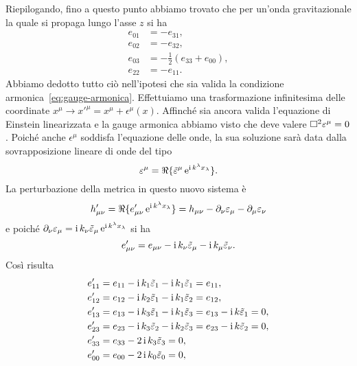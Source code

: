 Riepilogando, fino a questo punto abbiamo trovato che per un'onda gravitazionale
la quale si propaga lungo l'asse $z$ si ha
\begin{subequations}
  \begin{align}
    e_{01} &= -e_{31}, \\
    e_{02} &= -e_{32}, \\
    e_{03} &= -\frac{1}{2}(e_{33} + e_{00}), \\
    e_{22} &= -e_{11}.
  \end{align}
\end{subequations}
Abbiamo dedotto tutto ciò nell'ipotesi che sia valida la condizione
armonica~\eqref{eq:gauge-armonica}.  Effettuiamo una trasformazione infinitesima
delle coordinate $x^{\mu} \to x'^{\mu} = x^{\mu} + \epsilon^{\mu}(x)$.  Affinché
sia ancora valida l'equazione di Einstein linearizzata e la gauge armonica
abbiamo visto che deve valere $\Box^{2} \varepsilon^{\mu} = 0$.  Poiché anche
$\epsilon^{\mu}$ soddisfa l'equazione delle onde, la sua soluzione sarà data
dalla sovrapposizione lineare di onde del tipo
\begin{equation}
  \varepsilon^{\mu} = \Re\{\tilde{\varepsilon}^{\mu}\operatorname{\mathrm{e}}^{\operatorname{\mathrm{i}}
    k^{\lambda}x_{\lambda}}\}.
\end{equation}
La perturbazione della metrica in questo nuovo sistema è
\begin{equation}
  h'_{\mu\nu} = \Re\{e'_{\mu\nu} \operatorname{\mathrm{e}}^{\operatorname{\mathrm{i}} k^{\lambda}x_{\lambda}}\} =
  h_{\mu\nu} - \partial_{\nu}\varepsilon_{\mu} - \partial_{\mu}\varepsilon_{\nu}
\end{equation}
e poiché
$\partial_{\nu}\varepsilon_{\mu} = \operatorname{\mathrm{i}} k_{\nu}\tilde{\varepsilon}_{\mu}
\operatorname{\mathrm{e}}^{\operatorname{\mathrm{i}} k^{\lambda}x_{\lambda}}$ si ha
\begin{equation}
  e'_{\mu\nu} = e_{\mu\nu} - \operatorname{\mathrm{i}} k_{\nu}\tilde{\varepsilon}_{\mu} - \operatorname{\mathrm{i}}
  k_{\mu}\tilde{\varepsilon}_{\nu}.
\end{equation}
Così risulta
\begin{subequations}
  \begin{align}
    e'_{11} &= e_{11} - \operatorname{\mathrm{i}} k_{1} \tilde{\varepsilon}_{1} - \operatorname{\mathrm{i}}
    k_{1}\tilde{\varepsilon}_{1} = e_{11}, \\
    e'_{12} &= e_{12} - \operatorname{\mathrm{i}} k_{2}\tilde{\varepsilon}_{1} - \operatorname{\mathrm{i}}
    k_{1}\tilde{\varepsilon}_{2} = e_{12}, \\
    e'_{13} &= e_{13} - \operatorname{\mathrm{i}} k_{3}\tilde{\varepsilon}_{1} - \operatorname{\mathrm{i}}
    k_{1}\tilde{\varepsilon}_{3} = e_{13} - \operatorname{\mathrm{i}} k\tilde{\varepsilon}_{1} = 0, \\
    e'_{23} &= e_{23} - \operatorname{\mathrm{i}} k_{3}\tilde{\varepsilon}_{2} - \operatorname{\mathrm{i}}
    k_{2}\tilde{\varepsilon}_{3} = e_{23} - \operatorname{\mathrm{i}} k\tilde{\varepsilon}_{2} = 0, \\
    e'_{33} &= e_{33} - 2\operatorname{\mathrm{i}} k_{3}\tilde{\varepsilon}_{3} = 0, \\
    e'_{00} &= e_{00} - 2\operatorname{\mathrm{i}} k_{0}\tilde{\varepsilon}_{0} = 0,
  \end{align}
\end{subequations}
